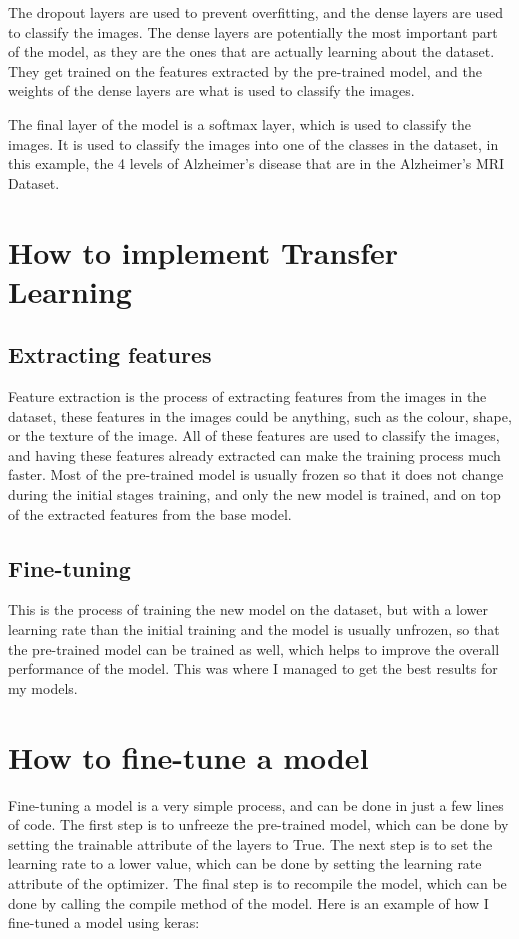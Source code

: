 \documentclass[]{final_report}
\begin{document}
The dropout layers are used to prevent overfitting, and the dense layers are used to classify the images.
The dense layers are potentially the most important part of the model, as they are the ones that are actually learning about the dataset.
They get trained on the features extracted by the pre-trained model, and the weights of the dense layers are what is used to classify the images.

The final layer of the model is a softmax layer, which is used to classify the images.
It is used to classify the images into one of the classes in the dataset, in this example,
the 4 levels of Alzheimer's disease that are in the Alzheimer's MRI Dataset.

\pagebreak
\section{How to implement Transfer Learning}

\subsection{Extracting features}
Feature extraction is the process of extracting features from the images in the dataset, these features
in the images could be anything, such as the colour, shape, or the texture of the image. All of these features
are used to classify the images, and having these features already extracted can make the training process much faster.
Most of the pre-trained model is usually frozen so that it does not change during the initial stages training, and only the new model is trained,
and on top of the extracted features from the base model.

\subsection{Fine-tuning}
This is the process of training the new model on the dataset, but with a lower learning rate than the initial training and the model is usually unfrozen,
so that the pre-trained model can be trained as well, which helps to improve the overall performance of the model.
This was where I managed to get the best results for my models.

\section{How to fine-tune a model}
Fine-tuning a model is a very simple process, and can be done in just a few lines of code.
The first step is to unfreeze the pre-trained model, which can be done by setting the trainable attribute of the layers to True.
The next step is to set the learning rate to a lower value, which can be done by setting the learning rate attribute of the optimizer.
The final step is to recompile the model, which can be done by calling the compile method of the model.
Here is an example of how I fine-tuned a model using keras:
\end{document}
